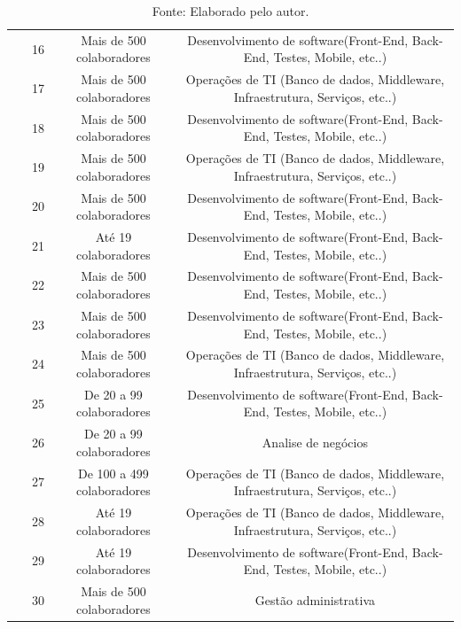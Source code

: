 \documentclass[twoside,english,brazilian]{UNISINOSartigo}
\newcommand{\source}[1]{\caption*{Fonte: {#1}} }
\begin{document}
\begin{table}[h]
\begin{tabularx}{\columnwidth}{cccc}
~ & 16 & Mais de 500 colaboradores & Desenvolvimento de software(Front-End, Back-End, Testes, Mobile, etc..) \\
~ & 17 & Mais de 500 colaboradores & Operações de TI (Banco de dados, Middleware, Infraestrutura, Serviços, etc..) \\
~ & 18 & Mais de 500 colaboradores & Desenvolvimento de software(Front-End, Back-End, Testes, Mobile, etc..) \\
~ & 19 & Mais de 500 colaboradores & Operações de TI (Banco de dados, Middleware, Infraestrutura, Serviços, etc..) \\
~ & 20 & Mais de 500 colaboradores & Desenvolvimento de software(Front-End, Back-End, Testes, Mobile, etc..) \\
~ & 21 & Até 19 colaboradores & Desenvolvimento de software(Front-End, Back-End, Testes, Mobile, etc..) \\
~ & 22 & Mais de 500 colaboradores & Desenvolvimento de software(Front-End, Back-End, Testes, Mobile, etc..) \\
~ & 23 & Mais de 500 colaboradores & Desenvolvimento de software(Front-End, Back-End, Testes, Mobile, etc..) \\
~ & 24 & Mais de 500 colaboradores & Operações de TI (Banco de dados, Middleware, Infraestrutura, Serviços, etc..) \\
~ & 25 & De 20 a 99 colaboradores & Desenvolvimento de software(Front-End, Back-End, Testes, Mobile, etc..) \\
~ & 26 & De 20 a 99 colaboradores & Analise de negócios \\
~ & 27 & De 100 a 499 colaboradores & Operações de TI (Banco de dados, Middleware, Infraestrutura, Serviços, etc..) \\
~ & 28 & Até 19 colaboradores & Operações de TI (Banco de dados, Middleware, Infraestrutura, Serviços, etc..) \\
~ & 29 & Até 19 colaboradores & Desenvolvimento de software(Front-End, Back-End, Testes, Mobile, etc..) \\
~ & 30 & Mais de 500 colaboradores & Gestão administrativa \\
    
    \end{tabularx}
    \source{Elaborado pelo autor.}
\end{table}
\end{document}
